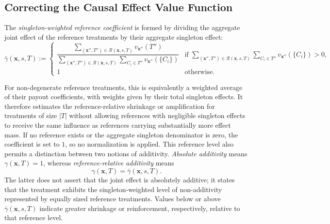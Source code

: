 \subsection{Correcting the Causal Effect Value Function}
\label{sec:corrected_value_function}

The \emph{singleton-weighted reference coefficient} is formed by dividing the
aggregate joint effect of the reference treatments by their aggregate singleton
effect:
\begin{equation}
	\label{eq:gamma_bar}
	\bar\gamma(\mathbf{x},s,T) :=
	\begin{cases}
		\dfrac{\displaystyle\sum_{(\mathbf{x}'',T'')\in\mathcal{R}(\mathbf{x},s,T)}v_{\mathbf{x}''}(T'')}
		{\displaystyle\sum_{(\mathbf{x}'',T'')\in\mathcal{R}(\mathbf{x},s,T)}\sum_{C_i\in T''}v_{\mathbf{x}''}(\{C_i\})}
		  & \text{if } \displaystyle\sum_{(\mathbf{x}'',T'')\in\mathcal{R}(\mathbf{x},s,T)}\sum_{C_i\in T''}v_{\mathbf{x}''}(\{C_i\}) > 0, \\[20pt]
		1 & \text{otherwise}.
	\end{cases}
\end{equation}

For non-degenerate reference treatments, this is equivalently a weighted average
of their payout coefficients, with weights given by their total singleton effects.
It therefore estimates the reference-relative shrinkage or amplification for
treatments of size $|T|$ without allowing references with negligible singleton
effects to receive the same influence as references carrying substantially more
effect mass. If no reference exists or the aggregate singleton denominator is
zero, the coefficient is set to $1$, so no normalization is applied. This
reference level also permits a distinction between two notions of additivity.
\emph{Absolute additivity} means $\gamma(\mathbf{x},T)=1$, whereas
\emph{reference-relative additivity} means
\begin{equation}
	\gamma(\mathbf{x},T)=\bar\gamma(\mathbf{x},s,T).
\end{equation}
The latter does not assert that the joint effect is absolutely additive; it states that the treatment exhibits the singleton-weighted level of non-additivity represented by equally sized reference treatments. Values below or above $\bar\gamma(\mathbf{x},s,T)$ indicate greater shrinkage or reinforcement, respectively, relative to that reference level.

